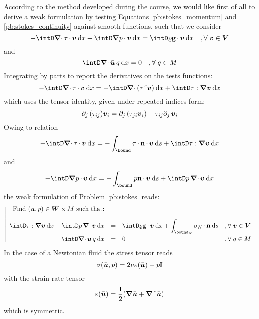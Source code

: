 \medskip
According to the method developed during the course, we would like first of all to derive a weak formulation by testing Equations \eqref{pb:stokes_momentum} and \eqref{pb:stokes_continuity} against smooth functions, such that we consider
\begin{equation*}
- \intD \Div\Tvisc\xDot\vv\dx + \intD \Grad p \xDot \vv\dx = \intD \dens\grav\xDot\vv\dx\quad,\forany\vv\in\xVd
\end{equation*}
and
\begin{equation*}
\intD \Div\bar\uu\,q\dx = 0\quad,\forany q\in\xM
\end{equation*}
Integrating by parts to report the derivatives on the tests functions:
\begin{equation*}
- \intD \Div\Tvisc\xDot\vv\dx = - \intD \Div(\Tvisc\trans\vv)\dx + \intD \Tvisc:\Grad\vv\dx
\end{equation*}
which uses the tensor identity, given under repeated indices form:
\begin{equation*}
\partial_{j}\,(\tau_{ij}){{\boldsymbol v}}_i = \partial_{j}\,(\tau_{ji}{{\boldsymbol v}}_i) - \tau_{ij}\partial_{j}\,{{\boldsymbol v}}_i
\end{equation*}
Owing to relation
\begin{equation*}
- \intD \Div\Tvisc\xDot\vv\dx = - \int_\bound \Tvisc\xDot\n\xDot\vv\ds + \intD \Tvisc:\Grad\vv\dx
\end{equation*}
and
\begin{equation*}
- \intD \Grad p\xDot\vv\dx = - \int_\bound p \n\xDot\vv\ds + \intD p\,\Div\vv\dx
\end{equation*}
the weak formulation of Problem \eqref{pb:stokes} reads:
\begin{equation*}\label{pb:stokes_weak}
\left\vert
\begin{array}{rlll}
\mbox{Find $(\bar\uu,p)\in \xWd\times\xM$ such that:}\\[2ex]
\displaystyle \intD \Tvisc:\Grad\vv\dx - \intD p\,\Div\vv\dx &=& \displaystyle\intD \dens\grav\xDot\vv\dx + \int_{\bound_N}\Stress_N\xDot\n\ds & ,\forany\vv\in\xVd\\[2ex]
\displaystyle \intD \Div\bar\uu\,q\dx &=& 0 & ,\forany q\in\xM
\end{array}
\right.
\end{equation*}
In the case of a Newtonian fluid the stress tensor reads
\begin{equation*}
\sigma(\bar{{{\boldsymbol u}}},p) = 2\nu\varepsilon(\bar{{{\boldsymbol u}}}) - p {\mathbf{\mathbb{I}}}
\end{equation*}
with the strain rate tensor
\begin{equation*}
\Strain(\bar\uu) = \dfrac{1}{2}(\Grad\bar\uu + \Grad\trans\bar\uu)
\end{equation*}
which is symmetric.

